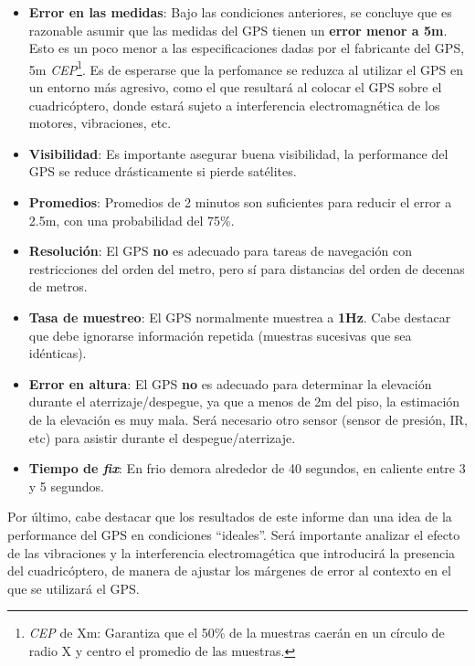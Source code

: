 \documentclass[spanish,12pt,a4paper,titlepage]{report}
\begin{document}
\begin{itemize}
\item \textbf{Error en las medidas}: Bajo las condiciones anteriores, se concluye que es razonable asumir que las medidas del GPS tienen un \textbf{error menor a 5m}. Esto es un poco menor a las especificaciones dadas por el fabricante del GPS, 5m \emph{CEP}\footnote{\textit{CEP} de Xm: Garantiza que el 50\% de la muestras caerán en un círculo de radio X y centro el promedio de las muestras.}. Es de esperarse que la perfomance se reduzca al utilizar el GPS en un entorno más agresivo, como el que resultará al colocar el GPS sobre el cuadricóptero, donde estará sujeto a  interferencia electromagnética de los motores, vibraciones, etc.
\item \textbf{Visibilidad}: Es importante asegurar buena visibilidad, la performance del GPS se reduce drásticamente si pierde satélites.
\item \textbf{Promedios}: Promedios de 2 minutos son suficientes para reducir el error a 2.5m, con una probabilidad del 75\%.
\item \textbf{Resolución}: El GPS \textbf{no} es adecuado para tareas de navegación con restricciones del orden del metro, pero sí para distancias del orden de decenas de metros.
\item \textbf{Tasa de muestreo}: El GPS normalmente muestrea a \textbf{1Hz}. Cabe destacar que debe ignorarse información repetida (muestras sucesivas que sea idénticas).
\item \textbf{Error en altura}: El GPS \textbf{no} es adecuado para determinar la elevación durante el aterrizaje/despegue, ya que a menos de 2m del piso, la estimación de la elevación es muy mala. Será necesario otro sensor (sensor de presión, IR, etc) para asistir durante el despegue/aterrizaje.
\item \textbf{Tiempo de \textit{fix}}: En frio demora alrededor de 40 segundos, en caliente entre 3 y 5 segundos.
\end{itemize}

Por último, cabe destacar que los resultados de este informe dan una idea de la performance del GPS en condiciones ``ideales''. Será importante analizar el efecto de las vibraciones y la interferencia electromagética que introducirá la presencia del cuadricóptero, de manera de ajustar los márgenes de error al contexto en el que se utilizará el GPS.
\end{document}

